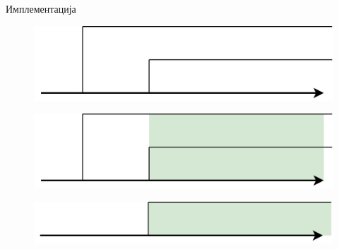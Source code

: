 \documentclass[xcolor=table]{beamer}
\begin{document}
\begin{frame}[allowframebreaks]{Имплементација}
        \framebreak
        
        \begin{figure}
            \centering
            \includegraphics[width=\textwidth,height=0.8\textheight,keepaspectratio]{images/uni_int6.png}
        \end{figure}
        
        \framebreak
        
        \begin{figure}
            \centering
            \includegraphics[width=\textwidth,height=0.8\textheight,keepaspectratio]{images/uni_int7.png}
        \end{figure}
        
        \framebreak
        
        \begin{figure}
            \centering
            \includegraphics[width=\textwidth,height=0.8\textheight,keepaspectratio]{images/uni_int5.png}
        \end{figure}
        
        \framebreak
        

\end{frame}
\end{document}
